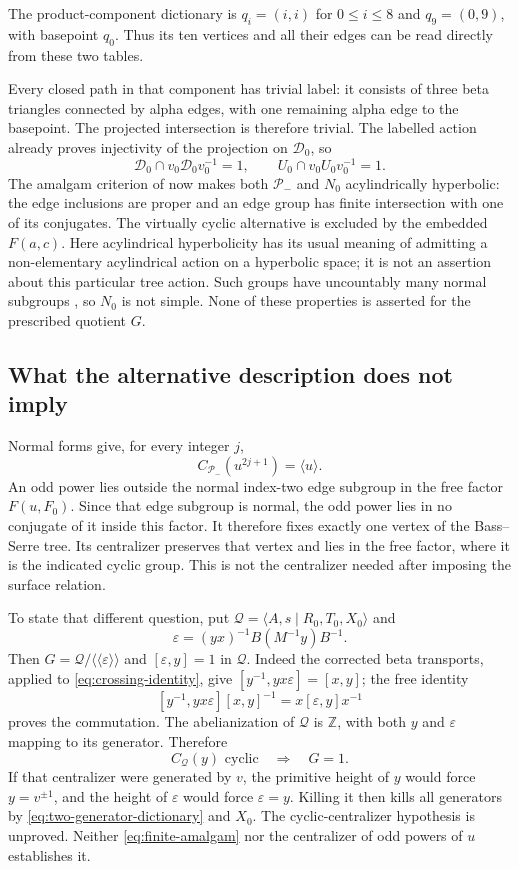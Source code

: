 \documentclass[11pt]{amsart}
\theoremstyle{definition}
\theoremstyle{remark}
\newcommand{\Z}{\mathbb Z}
\newcommand{\nc}[1]{\langle\!\langle #1\rangle\!\rangle}
\begin{document}
The product-component dictionary is $q_i=(i,i)$ for $0\le i\le8$
and $q_9=(0,9)$, with basepoint $q_0$. Thus its ten vertices and
all their edges can be read directly from these two tables.

Every closed path in that component has trivial label: it consists
of three beta triangles connected by alpha edges, with one remaining
alpha edge to the basepoint. The projected intersection is therefore
trivial. The labelled action already proves injectivity of the
projection on $\mathcal D_0$, so
\[
 \mathcal D_0\cap v_0\mathcal D_0v_0^{-1}=1,
 \qquad U_0\cap v_0U_0v_0^{-1}=1.
\]
The amalgam criterion of \cite[Corollary 2.2]{MO15} now makes both
$\mathcal P_-$ and $N_0$ acylindrically hyperbolic: the edge inclusions
are proper and an edge group has finite intersection with one of its
conjugates. The virtually cyclic alternative is excluded by the
embedded $F(a,c)$. Here acylindrical hyperbolicity has its usual meaning
of admitting a non-elementary acylindrical action on a hyperbolic space;
it is not an assertion about this particular tree action.
Such groups have uncountably many normal subgroups
\cite[Theorem 3.7(f)]{MO15}, so $N_0$ is not simple. None of these
properties is asserted for the prescribed quotient $G$.

\subsection{What the alternative description does not imply}
Normal forms give, for every integer $j$,
\[
 C_{\mathcal P_-}(u^{2j+1})=\langle u\rangle.
\]
An odd power lies outside the normal index-two edge subgroup in the
free factor $F(u,F_0)$. Since that edge subgroup is normal, the
odd power lies in no conjugate of it inside this factor. It therefore
fixes exactly one vertex of the Bass--Serre tree. Its centralizer
preserves that vertex and lies in the free factor, where it is the
indicated cyclic group. This is not the centralizer needed after imposing the surface
relation.

To state that different question, put
$\mathcal Q=\langle A,s\mid R_0,T_0,X_0\rangle$ and
\[
 \varepsilon=(yx)^{-1}B(M^{-1}y)B^{-1}.
\]
Then $G=\mathcal Q/\nc\varepsilon$ and $[\varepsilon,y]=1$
in $\mathcal Q$. Indeed the corrected beta transports, applied to
\eqref{eq:crossing-identity}, give
$[y^{-1},yx\varepsilon]=[x,y]$; the free identity
\[
 [y^{-1},yx\varepsilon][x,y]^{-1}=x[\varepsilon,y]x^{-1}
\]
proves the commutation. The abelianization of $\mathcal Q$ is $\Z$,
with both $y$ and $\varepsilon$ mapping to its generator. Therefore
\begin{equation}\label{eq:cyclic-centralizer}
       C_{\mathcal Q}(y)\text{ cyclic}\quad\Longrightarrow\quad G=1.
\end{equation}
If that centralizer were generated by $v$, the primitive height of
$y$ would force $y=v^{\pm1}$, and the height of $\varepsilon$ would
force $\varepsilon=y$. Killing it then kills all generators by
\eqref{eq:two-generator-dictionary} and $X_0$. The cyclic-centralizer
hypothesis is unproved. Neither \eqref{eq:finite-amalgam} nor the
centralizer of odd powers of $u$ establishes it.
\end{document}

